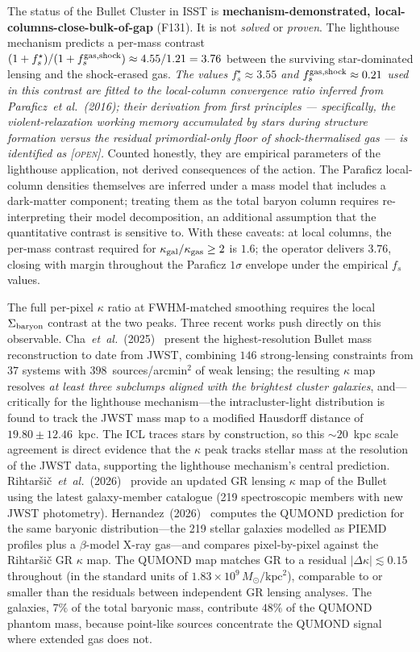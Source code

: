 \documentclass[aps,prd,twocolumn,nofootinbib,floatfix,superscriptaddress]{revtex4-2}
\newcommand{\OPEN}{{\color{black!60!red}\textsc{[open]}}}
\begin{document}
The status of the Bullet Cluster in ISST is
\textbf{mechanism-demonstrated, local-columns-close-bulk-of-gap}
(F131). It is not \emph{solved} or \emph{proven}. The lighthouse mechanism predicts a per-mass contrast
$(1+f_s^\star)/(1+f_s^{\rm gas,shock}) \approx 4.55/1.21 = 3.76$
between the surviving star-dominated lensing and the shock-erased
gas. \emph{The values $f_s^\star \approx 3.55$ and
$f_s^{\rm gas,shock} \approx 0.21$ used in this contrast are fitted
to the local-column convergence ratio inferred from
Paraficz~\emph{et al.}~(2016)\cite{Paraficz2016}; their derivation
from first principles --- specifically, the violent-relaxation
working memory accumulated by stars during structure formation
versus the residual primordial-only floor of shock-thermalised gas
--- is identified as \OPEN.} Counted honestly, they are empirical
parameters of the lighthouse application, not derived consequences
of the action. The Paraficz local-column densities themselves are
inferred under a mass model that includes a dark-matter component;
treating them as the total baryon column requires re-interpreting
their model decomposition, an additional assumption that the
quantitative contrast is sensitive to. With these caveats: at local
columns, the per-mass contrast required for
$\kappa_{\rm gal}/\kappa_{\rm gas}\geq 2$ is $1.6$; the operator
delivers $3.76$, closing with margin throughout the Paraficz
$1\sigma$ envelope under the empirical $f_s$ values.

The full per-pixel $\kappa$ ratio at FWHM-matched smoothing requires
the local $\Sigma_{\rm baryon}$ contrast at the two peaks. Three
recent works push directly on this observable.
Cha~\emph{et~al.}~(2025)~\cite{Cha2025} present the highest-resolution
Bullet mass reconstruction to date from JWST, combining $146$
strong-lensing constraints from $37$ systems with
$398$~sources/arcmin$^2$ of weak lensing; the resulting $\kappa$ map
resolves \emph{at least three subclumps aligned with the brightest
cluster galaxies}, and---critically for the lighthouse mechanism---the
intracluster-light distribution is found to track the JWST mass map
to a modified Hausdorff distance of
$19.80\pm 12.46$~kpc. The ICL traces stars by construction, so this
$\sim 20$~kpc scale agreement is direct evidence that the
$\kappa$ peak tracks stellar mass at the resolution of the
JWST data, supporting the lighthouse mechanism's central
prediction.
Rihtar\v{s}i\v{c}~\emph{et~al.}~(2026)~\cite{Rihtarsic2026} provide
an updated GR lensing $\kappa$ map of the Bullet using the latest
galaxy-member catalogue (219 spectroscopic members with new JWST
photometry).
Hernandez~(2026)~\cite{Hernandez2026} computes the QUMOND
prediction for the same baryonic distribution---the 219 stellar
galaxies modelled as PIEMD profiles plus a $\beta$-model X-ray
gas---and compares pixel-by-pixel against the Rihtar\v{s}i\v{c} GR
$\kappa$ map. The QUMOND map matches GR to a residual
$|\Delta\kappa|\lesssim 0.15$ throughout (in the standard units of
$1.83\times 10^{9}\,M_\odot/\mathrm{kpc}^2$), comparable to or
smaller than the residuals between independent GR lensing analyses.
The galaxies, $7\%$ of the total baryonic mass, contribute $48\%$
of the QUMOND phantom mass, because point-like sources concentrate
the QUMOND signal where extended gas does not.
\end{document}
